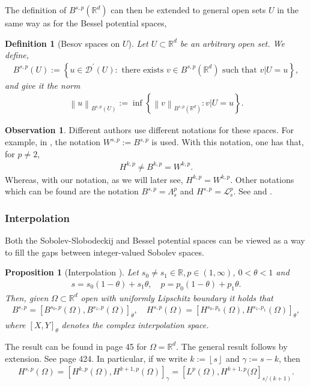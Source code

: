 \documentclass[
    a4paper,
    DIV=14,
    abstract=true,
    numbers=noenddot
]
{scrartcl}
\newtheorem{proposition}[theorem]{Proposition}
\newtheorem{definition}[theorem]{Definition}
\theoremstyle{definition}
\newtheorem{observation}{Observation}
\newcommand{\set}[1]{\left\{#1\right\}}
\renewcommand{\norm}[1]{\left\lVert #1 \right\rVert}\renewcommand{\abs}[1]{\left| #1 \right|}
\newcommand\restr[2]{\left.#1\right|{#2}}
\newcommand{\R}{\mathbb{R}}
\newcommand{\Ll}{\mathcal{L}}
\begin{document}
The definition of $B^{s,p}(\R^d)$ can then be extended to general open sets $U$ in the same way as for the Bessel potential spaces,
\begin{definition}[Besov spaces on $U$]
    Let $U \subset \R^d$ be an arbitrary open set. We define,
    \begin{align*}
        B^{s,p}(U):=\left\{u \in \mathcal{D}^{\prime}(U): \text{ there exists } v \in B^{s,p}(\R^d) \text{ such that } \restr{v}{U}=u\right\},
    \end{align*}
    and give it the norm
    \begin{align*}
        \norm{u}_{B^{s,p}(U)}:= \inf \set{\norm{v}_{B^{s,p}(\R^d)}: \restr{v}{U}=u}.
    \end{align*}
\end{definition}
\begin{observation}
    Different authors use different notations for these spaces. For example, in \cite{triebel1992theory}, the notation $W^{s,p}:= B^{s,p}$ is used. With this notation, one has that, for $p \neq 2$,
    \begin{align*}
        H^{k,p} \neq B^{k,p}= W^{k,p}.
    \end{align*}
    Whereas, with our notation, as we will later see, $H^{k,p}=W^{k,p}$. Other notations which can be found are  the notation $B^{s,p}= \Lambda^{p}_s$ and $H^{s,p}= \Ll ^{p}_s$. See \cite{stein1970singular} and \cite{biccari2018local}.
\end{observation}
\subsubsection{Interpolation}
Both the Sobolev-Slobodeckij and Bessel potential spaces can be viewed as a way to fill the gaps between integer-valued Sobolev spaces.
\begin{proposition}[Interpolation ]\label{interpolation}
    Let $s_0 \neq s_1 \in \R, p \in (1, \infty)$, $0<\theta<1$ and
    \begin{align*}
        s=s_0(1-\theta)+s_1 \theta, \quad p=p_0(1-\theta)+p_1 \theta.
    \end{align*}
    Then, given $\Omega \subset \R^d$ open with uniformly Lipschitz boundary it holds that
    \begin{align*}
        B^{s,p}=\left[B^{s_0,p}(\Omega ), B^{s_1, p}(\Omega )\right]_\theta,\quad H^{s,p}(\Omega )=\left[H^{s_0,p_0}(\Omega), H^{s_1,p_1}(\Omega)\right]_{\theta},
    \end{align*}
    where $[X,Y]_\theta$ denotes the complex interpolation space.
\end{proposition}
The result can be found in \cite{triebel1992theory} page 45 for $\Omega = \R^d$. The general result follows by extension. See \cite{leoni2017first} page 424. In particular, if we write $k:=\left\lfloor s \right\rfloor$ and $\gamma:=s-k$, then
\begin{align*}
    H^{s,p}(\Omega )=\left[H^{k,p}(\Omega), H^{k+1,p}(\Omega)\right]_{\gamma }= \left[L^p(\Omega ), H^{k+1,p}(\Omega\right]_{s/(k+1) }.
\end{align*}
\end{document}
